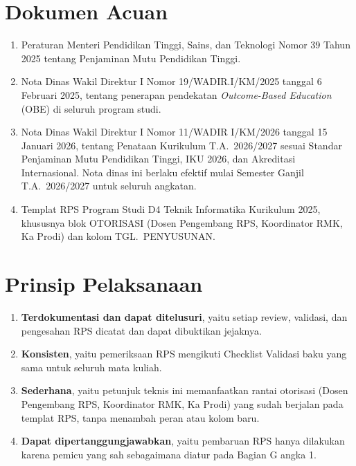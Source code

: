 \documentclass[12pt,a4paper]{report}
\begin{document}
\section{Dokumen Acuan}

\begin{enumerate}
\item Peraturan Menteri Pendidikan Tinggi, Sains, dan Teknologi Nomor 39 Tahun 2025 tentang Penjaminan Mutu Pendidikan Tinggi.
\item Nota Dinas Wakil Direktur I Nomor 19/WADIR.I/KM/2025 tanggal 6 Februari 2025, tentang penerapan pendekatan \emph{Outcome-Based Education} (OBE) di seluruh program studi.
\item Nota Dinas Wakil Direktur I Nomor 11/WADIR I/KM/2026 tanggal 15 Januari 2026, tentang Penataan Kurikulum T.A.\ 2026/2027 sesuai Standar Penjaminan Mutu Pendidikan Tinggi, IKU 2026, dan Akreditasi Internasional. Nota dinas ini berlaku efektif mulai Semester Ganjil T.A.\ 2026/2027 untuk seluruh angkatan.
\item Templat RPS Program Studi D4 Teknik Informatika Kurikulum 2025, khususnya blok OTORISASI (Dosen Pengembang RPS, Koordinator RMK, Ka Prodi) dan kolom TGL.\ PENYUSUNAN.
\end{enumerate}

\section{Prinsip Pelaksanaan}

\begin{enumerate}
\item \textbf{Terdokumentasi dan dapat ditelusuri}, yaitu setiap review, validasi, dan pengesahan RPS dicatat dan dapat dibuktikan jejaknya.
\item \textbf{Konsisten}, yaitu pemeriksaan RPS mengikuti Checklist Validasi baku yang sama untuk seluruh mata kuliah.
\item \textbf{Sederhana}, yaitu petunjuk teknis ini memanfaatkan rantai otorisasi (Dosen Pengembang RPS, Koordinator RMK, Ka Prodi) yang sudah berjalan pada templat RPS, tanpa menambah peran atau kolom baru.
\item \textbf{Dapat dipertanggungjawabkan}, yaitu pembaruan RPS hanya dilakukan karena pemicu yang sah sebagaimana diatur pada Bagian G angka 1.
\end{enumerate}
\end{document}
